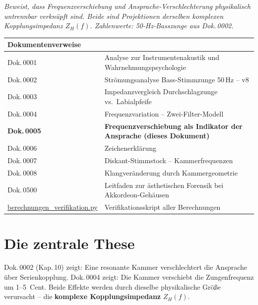\documentclass[11pt,a4paper]{article}
\begin{document}
\hbmaketitle

{\small\itshape Beweist, dass Frequenzverschiebung und Ansprache-Verschlechterung physikalisch untrennbar verknüpft sind. Beide sind Projektionen derselben komplexen Kopplungsimpedanz $Z_H(f)$. Zahlenwerte: 50-Hz-Basszunge aus Dok.\,0002.}

\vspace{2mm}
\begin{center}\small
\begin{tabularx}{\textwidth}{l X}
\hbtoprule
\textbf{Dokumentenverweise} \\
\midrule
Dok.\,0001 & Analyse zur Instrumentenakustik und Wahrnehmungspsychologie \\
Dok.\,0002 & Strömungsanalyse Bass-Stimmzunge 50\,Hz -- v8 \\
Dok.\,0003 & Impedanzvergleich Durchschlagzunge vs.\ Labialpfeife \\
Dok.\,0004 & Frequenzvariation -- Zwei-Filter-Modell \\
\textbf{Dok.\,0005} & \textbf{Frequenzverschiebung als Indikator der Ansprache (dieses Dokument)} \\
Dok.\,0006 & Zeichenerklärung \\
Dok.\,0007 & Diskant-Stimmstock -- Kammerfrequenzen \\
Dok.\,0008 & Klangveränderung durch Kammergeometrie \\
Dok.\,0500 & Leitfaden zur ästhetischen Forensik bei Akkordeon-Gehäusen \\
\midrule
\href{berechnungen_verifikation.py}{berechnungen\_verifikation.py} & Verifikationsskript aller Berechnungen \\
\bottomrule
\end{tabularx}
\end{center}
\vspace{4mm}

\section{Die zentrale These}

Dok.\,0002 (Kap.\,10) zeigt: Eine resonante Kammer verschlechtert die Ansprache über Serienkopplung. Dok.\,0004 zeigt: Die Kammer verschiebt die Zungenfrequenz um 1--5~Cent. Beide Effekte werden durch dieselbe physikalische Größe verursacht -- die \textbf{komplexe Kopplungsimpedanz} $Z_H(f)$.
\end{document}
